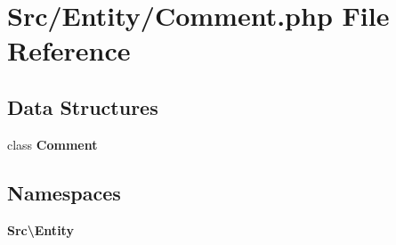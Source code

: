 \section{Src/\+Entity/\+Comment.php File Reference}
\label{_comment_8php}
\subsection*{Data Structures}
\begin{DoxyCompactItemize}
\item 
class \textbf{ Comment}
\end{DoxyCompactItemize}
\subsection*{Namespaces}
\begin{DoxyCompactItemize}
\item 
 \textbf{ Src\textbackslash{}\+Entity}
\end{DoxyCompactItemize}
